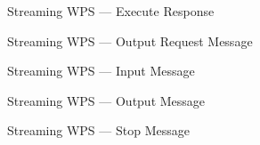 \documentclass[xcolor=svgnames,professionalfonts,11pt,aspectratio=43]{beamer}
\begin{document}
\begin{frame}[c,fragile]{Streaming WPS --- Execute Response}
    \begin{center}
      
    \end{center}
\end{frame}


\begin{frame}[c,fragile]{Streaming WPS --- Output Request Message}
    \begin{center}
      
    \end{center}
\end{frame}


\begin{frame}[c,fragile]{Streaming WPS --- Input Message}
    \begin{center}
      
    \end{center}
\end{frame}


\begin{frame}[c,fragile]{Streaming WPS --- Output Message}
    \begin{center}
      
    \end{center}
\end{frame}


\begin{frame}[c,fragile]{Streaming WPS --- Stop Message}
    \begin{center}
      
    \end{center}
\end{frame}
\end{document}

